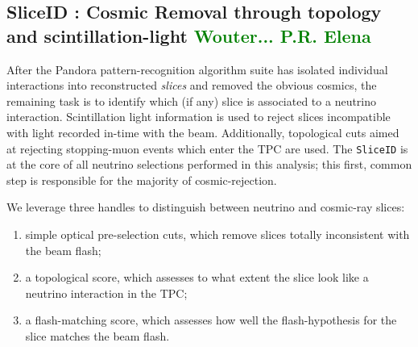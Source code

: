 \subsection{SliceID : Cosmic Removal through topology and scintillation-light \textcolor{green}{Wouter... P.R. Elena}}
\label{sec:sliceID:SliceID}
\par After the Pandora pattern-recognition algorithm suite has isolated individual interactions into reconstructed \emph{slices} and removed the obvious cosmics, the remaining task is to identify which (if any) slice is associated to a neutrino interaction. Scintillation light information is used to reject slices incompatible with light recorded in-time with the beam. Additionally, topological cuts aimed at rejecting stopping-muon events which enter the TPC are used. The \texttt{SliceID} is at the core of all neutrino selections performed in this analysis; this first, common step is responsible for the majority of cosmic-rejection.
\\
\par We leverage three handles to distinguish between neutrino and cosmic-ray slices:
\begin{enumerate}
    \item simple optical pre-selection cuts, which remove slices totally inconsistent with the beam flash;
    \item a topological score, which assesses to what extent the slice look like a neutrino interaction in the TPC;
    \item a flash-matching score, which assesses how well the flash-hypothesis for the slice matches the beam flash.
\end{enumerate}

